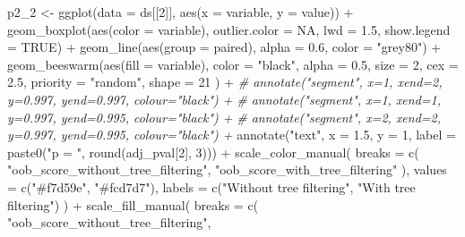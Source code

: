 \documentclass[
  11pt,
  oneside]{book}
\newenvironment{Shaded}{\begin{snugshade}}{\end{snugshade}}
\newcommand{\AttributeTok}[1]{\textcolor[rgb]{0.77,0.63,0.00}{#1}}
\newcommand{\CommentTok}[1]{\textcolor[rgb]{0.56,0.35,0.01}{\textit{#1}}}
\newcommand{\ConstantTok}[1]{\textcolor[rgb]{0.00,0.00,0.00}{#1}}
\newcommand{\DecValTok}[1]{\textcolor[rgb]{0.00,0.00,0.81}{#1}}
\newcommand{\FloatTok}[1]{\textcolor[rgb]{0.00,0.00,0.81}{#1}}
\newcommand{\FunctionTok}[1]{\textcolor[rgb]{0.00,0.00,0.00}{#1}}
\newcommand{\NormalTok}[1]{#1}
\newcommand{\OtherTok}[1]{\textcolor[rgb]{0.56,0.35,0.01}{#1}}
\newcommand{\SpecialCharTok}[1]{\textcolor[rgb]{0.00,0.00,0.00}{#1}}
\newcommand{\StringTok}[1]{\textcolor[rgb]{0.31,0.60,0.02}{#1}}
\begin{document}
\begin{Shaded}
\begin{Highlighting}[]
\NormalTok{p2\_2 }\OtherTok{\textless{}{-}} \FunctionTok{ggplot}\NormalTok{(}\AttributeTok{data =}\NormalTok{ ds[[}\DecValTok{2}\NormalTok{]], }\FunctionTok{aes}\NormalTok{(}\AttributeTok{x =}\NormalTok{ variable, }\AttributeTok{y =}\NormalTok{ value)) }\SpecialCharTok{+}
  \FunctionTok{geom\_boxplot}\NormalTok{(}\FunctionTok{aes}\NormalTok{(}\AttributeTok{color =}\NormalTok{ variable), }\AttributeTok{outlier.color =} \ConstantTok{NA}\NormalTok{, }\AttributeTok{lwd =} \FloatTok{1.5}\NormalTok{, }\AttributeTok{show.legend =} \ConstantTok{TRUE}\NormalTok{) }\SpecialCharTok{+}
  \FunctionTok{geom\_line}\NormalTok{(}\FunctionTok{aes}\NormalTok{(}\AttributeTok{group =}\NormalTok{ paired), }\AttributeTok{alpha =} \FloatTok{0.6}\NormalTok{, }\AttributeTok{color =} \StringTok{"grey80"}\NormalTok{) }\SpecialCharTok{+}
  \FunctionTok{geom\_beeswarm}\NormalTok{(}\FunctionTok{aes}\NormalTok{(}\AttributeTok{fill =}\NormalTok{ variable),}
    \AttributeTok{color =} \StringTok{"black"}\NormalTok{, }\AttributeTok{alpha =} \FloatTok{0.5}\NormalTok{, }\AttributeTok{size =} \DecValTok{2}\NormalTok{, }\AttributeTok{cex =} \FloatTok{2.5}\NormalTok{, }\AttributeTok{priority =} \StringTok{"random"}\NormalTok{,}
    \AttributeTok{shape =} \DecValTok{21}
\NormalTok{  ) }\SpecialCharTok{+}
  \CommentTok{\# annotate("segment", x=1, xend=2, y=0.997, yend=0.997, colour="black") +}
  \CommentTok{\# annotate("segment", x=1, xend=1, y=0.997, yend=0.995, colour="black") +}
  \CommentTok{\# annotate("segment", x=2, xend=2, y=0.997, yend=0.995, colour="black") +}
  \FunctionTok{annotate}\NormalTok{(}\StringTok{"text"}\NormalTok{, }\AttributeTok{x =} \FloatTok{1.5}\NormalTok{, }\AttributeTok{y =} \DecValTok{1}\NormalTok{, }\AttributeTok{label =} \FunctionTok{paste0}\NormalTok{(}\StringTok{"p = "}\NormalTok{, }\FunctionTok{round}\NormalTok{(adj\_pval[}\DecValTok{2}\NormalTok{], }\DecValTok{3}\NormalTok{))) }\SpecialCharTok{+}
  \FunctionTok{scale\_color\_manual}\NormalTok{(}
    \AttributeTok{breaks =} \FunctionTok{c}\NormalTok{(}
      \StringTok{"oob\_score\_without\_tree\_filtering"}\NormalTok{,}
      \StringTok{"oob\_score\_with\_tree\_filtering"}
\NormalTok{    ),}
    \AttributeTok{values =} \FunctionTok{c}\NormalTok{(}\StringTok{"\#f7d59e"}\NormalTok{, }\StringTok{"\#fcd7d7"}\NormalTok{),}
    \AttributeTok{labels =} \FunctionTok{c}\NormalTok{(}\StringTok{"Without tree filtering"}\NormalTok{, }\StringTok{"With tree filtering"}\NormalTok{)}
\NormalTok{  ) }\SpecialCharTok{+}
  \FunctionTok{scale\_fill\_manual}\NormalTok{(}
    \AttributeTok{breaks =} \FunctionTok{c}\NormalTok{(}
      \StringTok{"oob\_score\_without\_tree\_filtering"}\NormalTok{,}

\end{Highlighting}
\end{Shaded}
\end{document}
